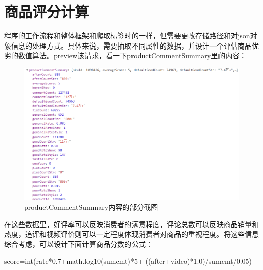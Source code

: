 \section{商品评分计算}
程序的工作流程和整体框架和爬取标签时的一样，但需要更改存储路径和对json对象信息的处理方式。具体来说，需要抽取不同属性的数据，并设计一个评估商品优劣的数值算法。preview该请求，看一下productCommentSummary里的内容：

\begin{figure}[htbp]
\centering
\includegraphics[width=13.5cm]{TIM图片20200111202951.png}
\caption{productCommentSummary内容的部分截图}
\end{figure}

在这些数据里，好评率可以反映消费者的满意程度，评论总数可以反映商品销量和热度，追评和视频评价则可以一定程度体现消费者对商品的重视程度。将这些信息综合考虑，可以设计下面计算商品分数的公式：

\begin{python}
score=int(rate*0.7+math.log10(sumcmt)*5+
                          ((after+video)*1.0)/sumcmt/0.05)
\end{python}

